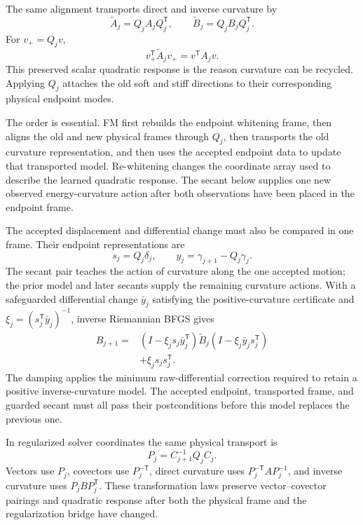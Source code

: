 \documentclass[10pt,twocolumn]{article}
\begin{document}
The same alignment transports direct and inverse curvature by
\begin{equation}
\widetilde A_j=Q_jA_jQ_j^{\mathsf T},
\qquad
\widetilde B_j=Q_jB_jQ_j^{\mathsf T}.
\label{eq:fm-curvature-transport}
\end{equation}
For \(v_+=Q_jv\),
\begin{equation}
v_+^{\mathsf T}\widetilde A_jv_+
=v^{\mathsf T}A_jv.
\label{eq:fm-quadratic-invariance}
\end{equation}
This preserved scalar quadratic response is the reason curvature can be
recycled. Applying \(Q_j\) attaches the old soft and stiff directions to their
corresponding physical endpoint modes.

The order is essential. FM first rebuilds the endpoint whitening frame, then
aligns the old and new physical frames through \(Q_j\), then transports the old
curvature representation, and then uses the accepted endpoint data to
update that transported model. Re-whitening changes the coordinate array used
to describe the learned quadratic response. The secant below supplies one new
observed energy-curvature action after both observations have been placed in
the endpoint frame.

The accepted displacement and differential change must also be compared in
one frame. Their endpoint representations are
\begin{equation}
s_j=Q_j\delta_j,
\qquad
y_j=\gamma_{j+1}-Q_j\gamma_j.
\label{eq:fm-secant}
\end{equation}
The secant pair teaches the action of curvature along the one accepted motion;
the prior model and later secants supply the remaining curvature actions. With
a safeguarded differential change \(\bar y_j\) satisfying the
positive-curvature certificate and
\(\xi_j=(s_j^{\mathsf T}\bar y_j)^{-1}\), inverse Riemannian BFGS gives
\begin{align}
B_{j+1}={}&
(I-\xi_js_j\bar y_j^{\mathsf T})\widetilde B_j
(I-\xi_j\bar y_js_j^{\mathsf T})\nonumber\\
&+\xi_js_js_j^{\mathsf T}.
\label{eq:fm-bfgs-compact}
\end{align}
The damping applies the minimum raw-differential correction required to retain
a positive inverse-curvature model. The accepted endpoint, transported
frame, and guarded secant must all pass their postconditions before this model
replaces the previous one.

In regularized solver coordinates the same physical transport is
\begin{equation}
P_j=C_{j+1}^{-1}Q_jC_j.
\label{eq:fm-regularized-transport}
\end{equation}
Vectors use \(P_j\), covectors use \(P_j^{-\mathsf T}\), direct curvature
uses \(P_j^{-\mathsf T}AP_j^{-1}\), and inverse curvature uses
\(P_jBP_j^{\mathsf T}\). These transformation laws preserve vector--covector
pairings and quadratic response after both the physical frame and the
regularization bridge have changed.
\end{document}
